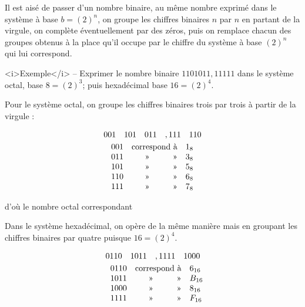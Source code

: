 \bigskip 

Il est aisé de  passer d'un nombre binaire, au même nombre exprimé dans le système
à base $b=(2)^{n}$, on groupe les chiffres binaires $n$ par $n$
en partant de la virgule, on complète éventuellement par des zéros,  puis on remplace chacun des groupes obtenus
à la place qu'il occupe par le chiffre du système à base $(2)^{n}$ qui lui correspond.

\newpage 

<i>Exemple</i> -- Exprimer le nombre binaire $1101011,11111$ dans le système octal, base $8=(2)^3$; puis hexadécimal base $16=(2)^4$. 

Pour le système octal, on groupe les chiffres binaires trois par trois à partir de la virgule :

\[ \begin{array}{@{\hspace*{5mm}}ccl} 
\multicolumn{3}{c}{001 \quad 101 \quad 011 \quad , 111 \quad  110} \\[1mm]
001 & \text{correspond à}  & 1_{8} \\ 
011 & \multicolumn{1}{r}{\text{»\hspace*{1cm}»}}  & 3_{8} \\ 
101 & \multicolumn{1}{r}{\text{»\hspace*{1cm}»}}  & 5_{8} \\ 
110 & \multicolumn{1}{r}{\text{»\hspace*{1cm}»}}  & 6_{8} \\ 
111 & \multicolumn{1}{r}{\text{»\hspace*{1cm}»}}  & 7_{8} \\ 
\end{array} 
\]

d'où le nombre octal correspondant  

Dans le système hexadécimal, on opère de la même manière mais en groupant les chiffres binaires par quatre puisque $16=(2)^4$.

\[ \begin{array}{@{\hspace*{5mm}}ccl} 
\multicolumn{3}{c}{0110 \quad 1011 \quad  , 1111 \quad  1000} \\[1mm]
0110 & \text{correspond à}  & 6_{16} \\ 
1011 & \multicolumn{1}{r}{\text{»\hspace*{1cm}»}}  & B_{16} \\ 
1000 & \multicolumn{1}{r}{\text{»\hspace*{1cm}»}}  & 8_{16} \\ 
1111& \multicolumn{1}{r}{\text{»\hspace*{1cm}»}}  & F_{16} \\ 
\end{array} 
\]

